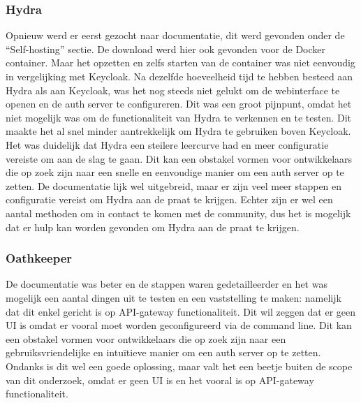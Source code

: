 \subsubsection{Hydra}%
\label{subsubsec:hydra}
Opnieuw werd er eerst gezocht naar documentatie, dit werd gevonden onder de ``Self-hosting'' sectie. De download werd hier ook gevonden voor de Docker container.
Maar het opzetten en zelfs starten van de container was niet eenvoudig in vergelijking met Keycloak. Na dezelfde hoeveelheid tijd te hebben besteed aan Hydra als aan Keycloak, was het nog steeds niet gelukt om de webinterface te openen en de auth server te configureren. 
Dit was een groot pijnpunt, omdat het niet mogelijk was om de functionaliteit van Hydra te verkennen en te testen. Dit maakte het al snel minder aantrekkelijk om Hydra te gebruiken boven Keycloak. Het was duidelijk dat Hydra een steilere leercurve had en meer configuratie vereiste om aan de slag te gaan. Dit kan een obstakel vormen voor ontwikkelaars die op zoek zijn naar een snelle en eenvoudige manier om een auth server op te zetten.
De documentatie lijk wel uitgebreid, maar er zijn veel meer stappen en configuratie vereist om Hydra aan de praat te krijgen. 
Echter zijn er wel een aantal methoden om in contact te komen met de community, dus het is mogelijk dat er hulp kan worden gevonden om Hydra aan de praat te krijgen.

\subsubsection{Oathkeeper}%
\label{subsubsec:oathkeeper}
De documentatie was beter en de stappen waren gedetailleerder en het was mogelijk een aantal dingen uit te testen en een vaststelling te maken: namelijk dat dit enkel gericht is op API-gateway functionaliteit. 
Dit wil zeggen dat er geen UI is omdat er vooral moet worden geconfigureerd via de command line. Dit kan een obstakel vormen voor ontwikkelaars die op zoek zijn naar een gebruiksvriendelijke en intuïtieve manier om een auth server op te zetten.
Ondanks is dit wel een goede oplossing, maar valt het een beetje buiten de scope van dit onderzoek, omdat er geen UI is en het vooral is op API-gateway functionaliteit.